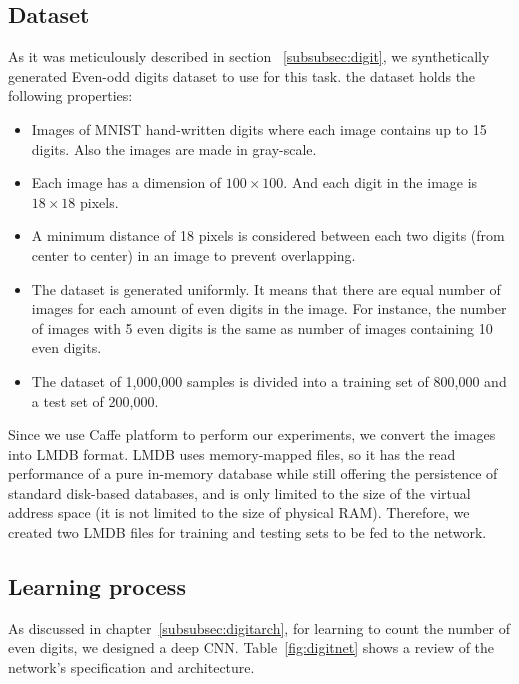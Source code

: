 \subsection{Dataset} 
As it was meticulously described in section ~\ref{subsubsec:digit}, we synthetically generated Even-odd digits dataset to use for this task. the dataset holds the following properties:
\begin{itemize}
\item Images of MNIST hand-written digits where each image contains up to 15 digits. Also the images are made in gray-scale.
\item Each image has a dimension of $100\times100$. And each digit in the image is $18\times18$ pixels.  
\item A minimum distance of 18 pixels is considered between each two digits (from center to center) in an image to prevent overlapping.
\item The dataset is generated uniformly. It means that there are equal number of images for each amount of even digits in the image. For instance, the number of images with 5 even digits is the same as number of images containing 10 even digits.
\item The dataset of 1,000,000 samples is divided into a training set of 800,000 and a test set of 200,000. 
\end{itemize}

Since we use Caffe platform to perform our experiments, we convert the images into LMDB format. LMDB uses memory-mapped files, so it has the read performance of a pure in-memory database while still offering the persistence of standard disk-based databases, and is only limited to the size of the virtual address space (it is not limited to the size of physical RAM). Therefore, we created two LMDB files for training and testing sets to be fed to the network.  

\subsection{Learning process}

As discussed in chapter~\ref{subsubsec:digitarch}, for learning to count the number of even digits, we designed a deep CNN. Table~\ref{fig:digitnet} shows a review of the network's specification and architecture.

